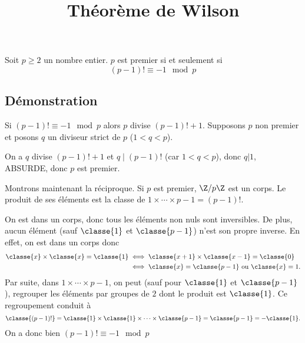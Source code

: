 \documentclass[fontsize=12pt,twoside=false,parskip=half]{scrartcl}
\title{Théorème de Wilson}
\date{}
\author{}
\begin{document}
\maketitle
   \begin{Theoreme}
      Soit $p \geq 2$ un nombre entier. $p$ est premier si et seulement si
      \[
         (p - 1)! \equiv -1 \mod p
      \]
   \end{Theoreme}
   \subsection{Démonstration}
      Si $(p - 1)! \equiv -1 \mod p$ alors $p$ divise $(p - 1)! + 1$. Supposons $p$ non premier et posons $q$
      un diviseur strict de $p$ ($1 < q < p$).
      
      On a $q$ divise $(p - 1)! + 1$ et $q \mid (p - 1)!$ (car $1 < q < p$), donc $q | 1$, ABSURDE, donc $p$ 
      est premier.
      
      Montrons maintenant la réciproque. Si $p$ est premier, $\Z/p\Z$ est un corps. Le produit
      de ses éléments est la classe de $1 \times \cdots \times p - 1 = (p - 1)!$.
      
      On est dans un corps, donc tous les éléments non nuls sont inversibles. De plus, aucun élément (sauf $\classe{1}$ 
      et $\classe{p - 1}$) n’est son propre inverse. En effet, on est dans un corps donc
      \begin{align*}
         \classe{x} \times \classe{x} = \classe{1} &\iff \classe{x + 1} \times \classe{x - 1} = \classe{0}\\
                                                   &\iff \classe{x} = \classe{p - 1} \text{ ou } \classe{x} = 1.
      \end{align*}
      Par suite, dans $1 \times \cdots \times p - 1$, on peut (sauf pour $\classe{1}$ et $\classe{p - 1}$), 
      regrouper les éléments par groupes de $2$ dont le produit est $\classe{1}$. Ce regroupement conduit à
      \[
         \classe{(p - 1)!} = \classe{1} \times \classe{1} \times \cdots \times \classe{p - 1} = \classe{p - 1} = -\classe{1}.
      \]
      On a donc bien $(p - 1)! \equiv -1 \mod p$
\end{document}
